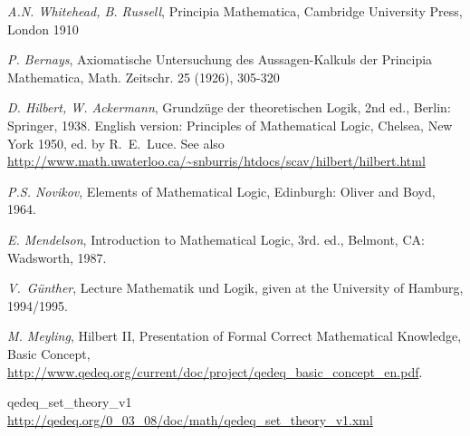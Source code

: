 \documentclass[a4paper,german,10pt,twoside]{book}
\theoremstyle{definition}
\theoremstyle{remark}
\begin{document}

\begin{thebibliography}{99}
 \emph{A.N. Whitehead, B. Russell}, Principia Mathematica, Cambridge University Press, London 1910

 \emph{P. Bernays}, Axiomatische Untersuchung des Aussagen-Kalkuls der {\glqq Principia Mathematica\grqq}, Math. Zeitschr. 25 (1926), 305-320

 \emph{D. Hilbert, W. Ackermann}, Grundz{\"u}ge der theoretischen Logik, 2nd ed., Berlin: Springer, 1938. English version: Principles of Mathematical Logic, Chelsea, New York 1950, ed. by R.~E.~Luce.
See also \url{http://www.math.uwaterloo.ca/~snburris/htdocs/scav/hilbert/hilbert.html}

 \emph{P.S. Novikov}, Elements of Mathematical Logic, Edinburgh: Oliver and Boyd, 1964.

 \emph{E. Mendelson}, Introduction to Mathematical Logic, 3rd. ed., Belmont, CA: Wadsworth, 1987.

 \emph{V.~G{\"u}nther}, Lecture {\glqq Mathematik und Logik\grqq}, given at the University of Hamburg, 1994/1995.

 \emph{M. Meyling}, Hilbert II, Presentation of Formal Correct Mathematical Knowledge, Basic Concept,
\url{http://www.qedeq.org/current/doc/project/qedeq_basic_concept_en.pdf}.



 qedeq\_set\_theory\_v1 \url{http://qedeq.org/0_03_08/doc/math/qedeq_set_theory_v1.xml}


\end{thebibliography}
\backmatter

 \printindex
\end{document}

